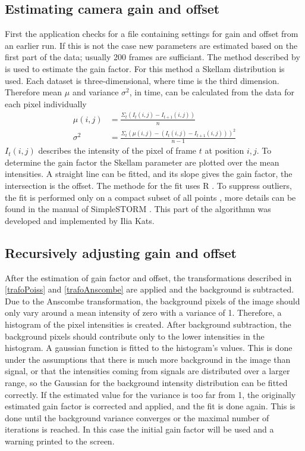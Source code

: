 \subsection{Estimating camera gain and offset}
First the application checks for a file containing settings for gain and offset from an earlier run. If this is not the case new parameters are estimated based on the first part of the data; usually 200 frames are sufficiant.\newline
The method described by \cite{skellam} is used to estimate the
gain factor. For this method a Skellam distribution is used. 
Each dataset is three-dimensional, where time is the third
dimension. Therefore mean $\mu$ and variance $\sigma^2$, in time, can be calculated from
the data for each pixel individually
\begin{align}
	\mu(i,j) & = \frac{\Sigma_t(I_t(i,j)-I_{t+1}(i,j))}{n}\\
	\sigma^2 & = \frac{\Sigma_t(\mu(i,j)-(I_t(i,j)-I_{t+1}(i,j)))^2}{n-1}
\end{align} 
$I_t(i,j)$ describes the intensity of the pixel of frame $t$ at position $i,j$.
To determine the gain factor the Skellam parameter are plotted over the mean
intensities. A straight line can be fitted, and its slope gives the gain
factor, the intersection is the offset.\newline 
The methode for the fit uses R \cite{Rcite}. To suppress outliers, the fit is performed only on a compact subset of all points \cite{ilia1}, more details can be found in the manual of SimpleSTORM \cite{ilia2}. This part of the algorithmn was developed and implemented by Ilia Kats.  
\subsection{Recursively adjusting gain and offset}
After the estimation of gain factor and offset, the transformations described in \ref{trafoPoiss} and \ref{trafoAnscombe} are applied and the background is subtracted.\newline
Due to the Anscombe transformation, the background pixels of the image should only vary around a mean intensity of zero with a variance of 1. Therefore, a histogram of the pixel intensities is created. After background subtraction, the background pixels should contribute only to the lower intensities in the histogram. A gaussian function is fitted to the histogram's values. This is done under the assumptions that there is much more background in the image than signal, or that the intensities coming from signals are distributed over a larger range, so the Gaussian for the background intensity distribution can be fitted correctly.\newline
If the estimated value for the variance is too far from 1, the originally estimated gain factor is corrected and applied, and the fit is done again. This is done until the background variance converges or the maximal number of iterations is reached. In this case the initial gain factor will be used and a warning printed to the screen.
